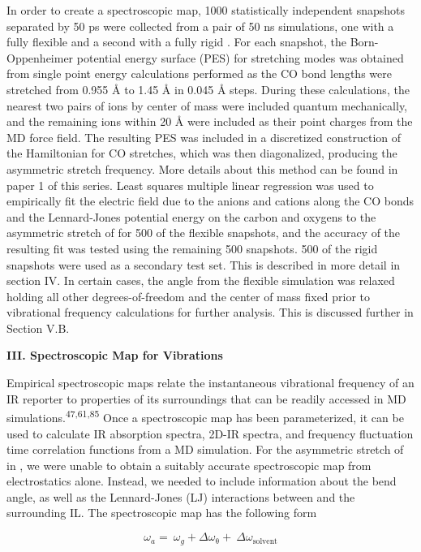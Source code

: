 \documentclass[]{article}
\begin{document}
In order to create a spectroscopic map, 1000 statistically independent snapshots separated by 50 ps were collected from a pair of 50 ns simulations, one with a fully flexible  and a second with a fully rigid . For each snapshot, the Born-Oppenheimer potential energy surface (PES) for  stretching modes was obtained from single point energy calculations performed as the CO bond lengths were stretched from 0.955 Å to 1.45 Å in 0.045 Å steps. During these calculations, the nearest two pairs of ions by center of mass were included quantum mechanically, and the remaining ions within 20 Å were included as their point charges from the MD force field. The resulting PES was included in a discretized construction of the Hamiltonian for CO stretches, which was then diagonalized, producing the asymmetric stretch frequency. More details about this method can be found in paper 1 of this series. Least squares multiple linear regression was used to empirically fit the electric field due to the anions and cations along the CO bonds and the Lennard-Jones potential energy on the  carbon and oxygens to the asymmetric stretch of  for 500 of the flexible snapshots, and the accuracy of the resulting fit was tested using the remaining 500 snapshots. 500 of the rigid snapshots were used as a secondary test set. This is described in more detail in section IV.  In certain cases, the  angle from the flexible simulation was relaxed holding all other degrees-of-freedom and the  center of mass fixed prior to vibrational frequency calculations for further analysis. This is discussed further in Section V.B.

\textbf{III. Spectroscopic Map for  Vibrations}

Empirical spectroscopic maps relate the instantaneous vibrational frequency of an IR reporter to properties of its surroundings that can be readily accessed in MD simulations.\textsuperscript{47,61,85} Once a spectroscopic map has been parameterized, it can be used to calculate IR absorption spectra, 2D-IR spectra, and frequency fluctuation time correlation functions from a MD simulation. For the asymmetric stretch of  in \ce{[C4C1im][PF6]}, we were unable to obtain a suitably accurate spectroscopic map from electrostatics alone. Instead, we needed to include information about the  bend angle, as well as the Lennard-Jones (LJ) interactions between  and the surrounding IL. The spectroscopic map has the following form

\[\omega_{a} = \ \omega_{g} + \Delta\omega_{\mathrm{\theta}} + \ \Delta\omega_{\mathrm{\text{solvent}}}\]
\end{document}
